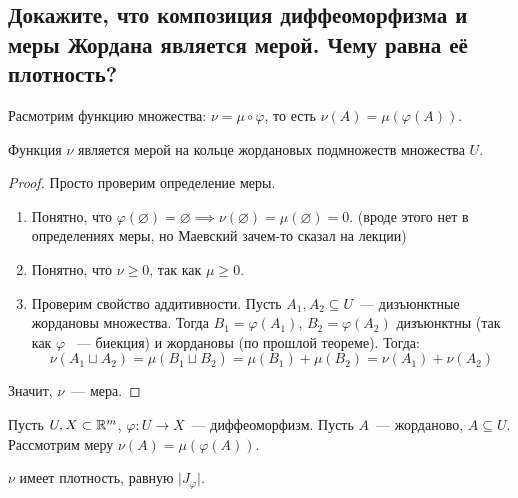 
\subsection{Докажите, что композиция диффеоморфизма и меры Жордана является мерой. Чему равна её плотность?}

Расмотрим функцию множества: $\nu = \mu \circ \varphi$, то есть $\nu(A) = \mu(\varphi(A))$.

\begin{theorem*}
    Функция $\nu$ является мерой на кольце жордановых подмножеств множества $U$.
\end{theorem*}
\begin{proof}
    Просто проверим определение меры.
    \begin{enumerate}
        \item Понятно, что $\varphi(\varnothing) = \varnothing \implies \nu(\varnothing) = \mu(\varnothing) = 0$. (вроде этого нет в определениях меры, но Маевский зачем-то сказал на лекции)
        \item Понятно, что $\nu \geq 0$, так как $\mu \geq 0$.
        \item Проверим свойство аддитивности.
        Пусть $A_1, A_2 \subseteq U$~--- дизъюнктные жордановы множества. Тогда $B_1 = \varphi(A_1)$, $ B_2 = \varphi(A_2)$ дизъюнктны (так как $\varphi$ ~--- биекция) и жордановы (по прошлой теореме). Тогда:
        \begin{equation*}
            \nu(A_1 \sqcup A_2) = \mu(B_1 \sqcup B_2) = \mu(B_1) + \mu(B_2) = \nu(A_1) + \nu(A_2)
        \end{equation*}
    \end{enumerate}
    Значит, $\nu$~--- мера.
\end{proof}
    
Пусть $U, X \subset \mathbb{R}^m$, $\varphi:U \to X$~--- диффеоморфизм. Пусть $A$~--- жорданово, $A \subseteq U$. Рассмотрим меру $\nu(A) = \mu(\varphi(A))$. 

\begin{proposition*}
    $\nu$ имеет плотность, равную $\lvert J_\varphi \rvert$.
\end{proposition*}

